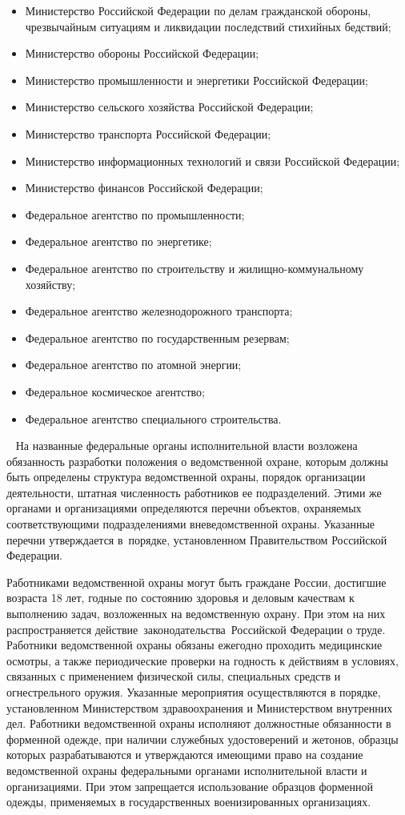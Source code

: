 \documentclass[a4paper,12pt,fleqn]{article} %
\begin{document}
\begin{itemize}
	\item Министерство Российской Федерации по делам гражданской обороны, чрезвычайным ситуациям и ликвидации последствий стихийных бедствий;
	\item Министерство обороны Российской Федерации;
	\item Министерство промышленности и энергетики Российской Федерации;
	\item Министерство сельского хозяйства Российской Федерации;
	\item Министерство транспорта Российской Федерации;
	\item Министерство информационных технологий и связи Российской Федерации;
	\item Министерство финансов Российской Федерации;
	\item Федеральное агентство по промышленности;
	\item Федеральное агентство по энергетике;
	\item Федеральное агентство по строительству и жилищно-коммунальному хозяйству;
	\item Федеральное агентство железнодорожного транспорта;
	\item Федеральное агентство по государственным резервам;
	\item Федеральное агентство по атомной энергии;
	\item Федеральное космическое агентство;
	\item Федеральное агентство специального строительства.
\end{itemize}
 
На названные федеральные органы исполнительной власти возложена обязанность разработки положения о ведомственной охране, которым должны быть определены структура ведомственной охраны, порядок организации деятельности, штатная численность работников ее подразделений. Этими же органами и организациями определяются перечни объектов, охраняемых соответствующими подразделениями вневедомственной охраны.  Указанные перечни утверждается в порядке, установленном Правительством Российской Федерации.

Работниками ведомственной охраны могут быть граждане России, достигшие возраста 18 лет, годные по состоянию здоровья и деловым качествам к выполнению задач, возложенных на ведомственную охрану. При этом на них распространяется действие законодательства Российской Федерации о труде. Работники ведомственной охраны обязаны ежегодно проходить медицинские осмотры, а также периодические проверки на годность к действиям в условиях, связанных с применением физической силы, специальных средств и огнестрельного оружия. Указанные мероприятия осуществляются в порядке, установленном Министерством здравоохранения и Министерством внутренних дел.	Работники ведомственной охраны исполняют должностные обязанности в форменной одежде, при наличии служебных удостоверений и жетонов, образцы которых разрабатываются и утверждаются имеющими право на создание ведомственной охраны федеральными органами исполнительной власти и организациями. При этом запрещается использование образцов форменной одежды, применяемых в государственных военизированных организациях.
\end{document}
